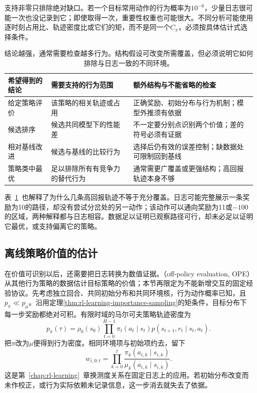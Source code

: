 支持非零只排除绝对缺口。若一个目标常用动作的行为概率为$10^{-6}$，少量日志很可能一次也没记录到它；即使取得一次，重要性权重也可能很大。不同分析可能使用逐时刻占用比、轨迹密度比或它们的矩，而不是同一个$C_\pi$，必须按具体估计式选择条件。

\begin{table}[htbp]
  \centering
  \small
  \begin{tabularx}{\linewidth}{p{26mm}XX}
    \toprule
    希望得到的结论 & 需要支持的行为范围 & 额外结构与不能省略的检查 \\
    \midrule
    给定策略评价 & 该策略的相关轨迹或占用 & 正确奖励、初始分布与行为机制；模型外推须有依据 \\
    候选排序 & 候选共同模型下的性能差 & 不一定要分别点识别两个价值；差的符号必须有证据 \\
    相对基线改进 & 候选与基线的比较行为 & 选择后仍有效的误差控制；缺数据处可限制回到基线 \\
    策略类中最优 & 足以排除所有有竞争力的替代行为 & 通常需更广覆盖或更强结构；高回报轨迹本身不够 \\
    \bottomrule
  \end{tabularx}
  \caption{结论越强，通常需要检查越多行为。结构假设可改变所需覆盖，但必须说明它如何排除与日志一致的不同环境。}
  \label{tab:rl-information-claims}
\end{table}

表~\ref{tab:rl-information-claims}~也解释了为什么几条高回报轨迹不等于充分覆盖。日志可能完整展示一条奖励为10的路径，却没有尝试分岔处的另一动作；该动作可以通向奖励为11或$-100$的区域，两种解释都与日志相容。数据足以证明已观察路径可行，却未必足以证明它最优，或支持偏离它的策略。

\subsection{离线策略价值的估计}
\label{sec:rl-information-estimators}

在价值可识别以后，还需要把日志转换为数值证据。（off-policy evaluation, OPE）从其他行为策略的数据估计目标策略的价值；本节再限定为不能新增交互的固定经验协议。先考虑独立回合、共同初始分布和共同环境核，行为动作概率已知，且$p_\pi\ll p_\mu$。沿用定理\ref{thm:rl-learning-importance-sampling}的矩条件，目标分布下每一步奖励都绝对可积。有限时域的马尔可夫策略轨迹密度为
\[
  p_\pi(\tau)=\rho_0(s_0)
       \prod_{t=0}^{H-1}
       \pi_t(a_t\mid s_t)p(s_{t+1},r_t\mid s_t,a_t).
\]
把$\pi$改为$\mu$便得到行为密度。相同环境项与初始项约去，留下
\begin{equation}
  \label{eq:rl-information-weights}
  w_{i,0:t}=\prod_{k=0}^{t}
       \frac{\pi_k(a_{i,k}\mid s_{i,k})}
            {\mu_k(a_{i,k}\mid s_{i,k})}.
\end{equation}
这是第~\ref{chap:rl-learning}~章换测度关系在固定日志上的应用。若初始分布改变而未作校正，或行为实际依赖未记录信息，这一步消去就失去了依据。

